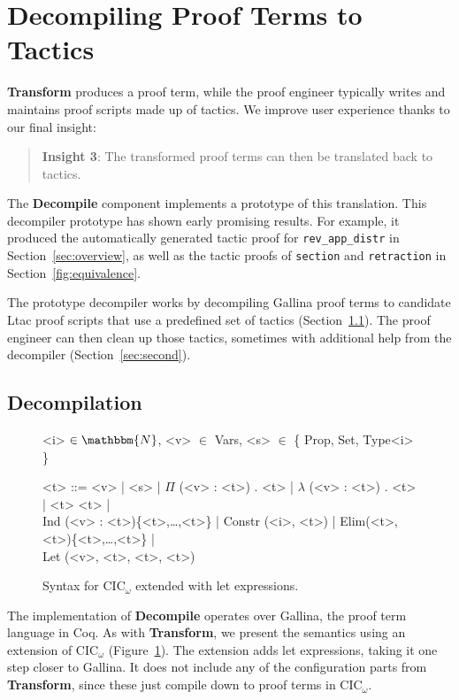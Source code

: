\section{Decompiling Proof Terms to Tactics}
\label{sec:decompiler}

\textbf{Transform} produces a proof term,
while the proof engineer typically writes and maintains proof scripts made up of tactics.
We improve user experience thanks to our final insight:

\begin{quote}
\textbf{Insight 3}: The transformed proof terms can then be translated back to tactics.
\end{quote}

The \textbf{Decompile} component implements a prototype of this translation.
This decompiler prototype has shown early promising results.
For example, it produced the automatically generated tactic proof for \lstinline{rev_app_distr} 
in Section~\ref{sec:overview}, as well as the tactic proofs of \lstinline{section}
and \lstinline{retraction} in Section~\ref{fig:equivalence}.

The prototype decompiler works by decompiling Gallina proof terms to candidate Ltac proof scripts that use a predefined set of 
tactics (Section~\ref{sec:first}).
The proof engineer can then clean up those tactics, sometimes with additional help from the decompiler (Section~\ref{sec:second}).

\subsection{Decompilation}
\label{sec:first}

\begin{figure}
\small
\begin{grammar}
<i> $\in \mathbbm{N}$, <v> $\in$ Vars, <s> $\in$ \{ Prop, Set, Type<i> \}

<t> ::= <v> | <s> | $\Pi$ (<v> : <t>) . <t> | $\lambda$ (<v> : <t>) . <t> | <t> <t> | \\
Ind (<v> : <t>)\{<t>,\ldots,<t>\} | Constr (<i>, <t>) | Elim(<t>, <t>)\{<t>,\ldots,<t>\} | \\
Let (<v>, <t>, <t>, <t>)
\end{grammar}
\caption{Syntax for CIC$_{\omega}$ extended with let expressions.}
\label{fig:gallinasyntax}
\end{figure}

The implementation of \textbf{Decompile} operates over Gallina, the proof term language in Coq.
As with \textbf{Transform}, we present the semantics using an extension of CIC$_{\omega}$ (Figure~\ref{fig:gallinasyntax}).
The extension adds let expressions, taking it one step closer to Gallina.
It does not include any of the configuration parts from \textbf{Transform}, since these just compile down to proof terms in CIC$_{\omega}$.

